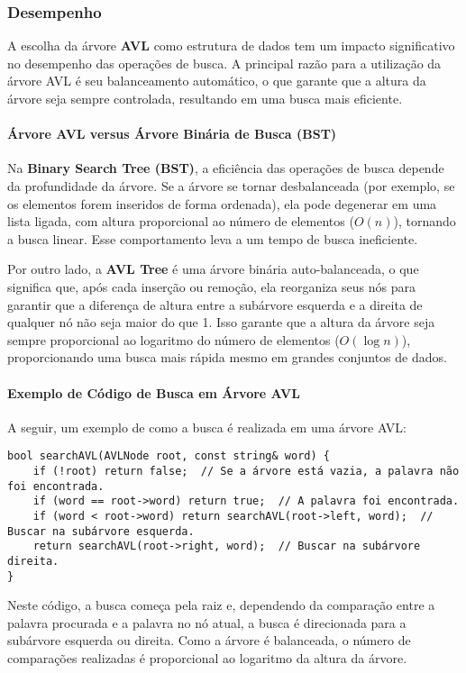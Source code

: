 \documentclass{article}
\begin{document}
\subsubsection{Desempenho}

A escolha da árvore \textbf{AVL} como estrutura de dados tem um impacto significativo no desempenho das operações de busca. A principal razão para a utilização da árvore AVL é seu balanceamento automático, o que garante que a altura da árvore seja sempre controlada, resultando em uma busca mais eficiente.

\paragraph{Árvore AVL versus Árvore Binária de Busca (BST)}
Na \textbf{Binary Search Tree (BST)}, a eficiência das operações de busca depende da profundidade da árvore. Se a árvore se tornar desbalanceada (por exemplo, se os elementos forem inseridos de forma ordenada), ela pode degenerar em uma lista ligada, com altura proporcional ao número de elementos (\(O(n)\)), tornando a busca linear. Esse comportamento leva a um tempo de busca ineficiente.

Por outro lado, a \textbf{AVL Tree} é uma árvore binária auto-balanceada, o que significa que, após cada inserção ou remoção, ela reorganiza seus nós para garantir que a diferença de altura entre a subárvore esquerda e a direita de qualquer nó não seja maior do que 1. Isso garante que a altura da árvore seja sempre proporcional ao logaritmo do número de elementos (\(O(\log n)\)), proporcionando uma busca mais rápida mesmo em grandes conjuntos de dados.

\paragraph{Exemplo de Código de Busca em Árvore AVL}
A seguir, um exemplo de como a busca é realizada em uma árvore AVL:

\begin{verbatim}
bool searchAVL(AVLNode root, const string& word) {
    if (!root) return false;  // Se a árvore está vazia, a palavra não foi encontrada.
    if (word == root->word) return true;  // A palavra foi encontrada.
    if (word < root->word) return searchAVL(root->left, word);  // Buscar na subárvore esquerda.
    return searchAVL(root->right, word);  // Buscar na subárvore direita.
}
\end{verbatim}

Neste código, a busca começa pela raiz e, dependendo da comparação entre a palavra procurada e a palavra no nó atual, a busca é direcionada para a subárvore esquerda ou direita. Como a árvore é balanceada, o número de comparações realizadas é proporcional ao logaritmo da altura da árvore.
\end{document}
